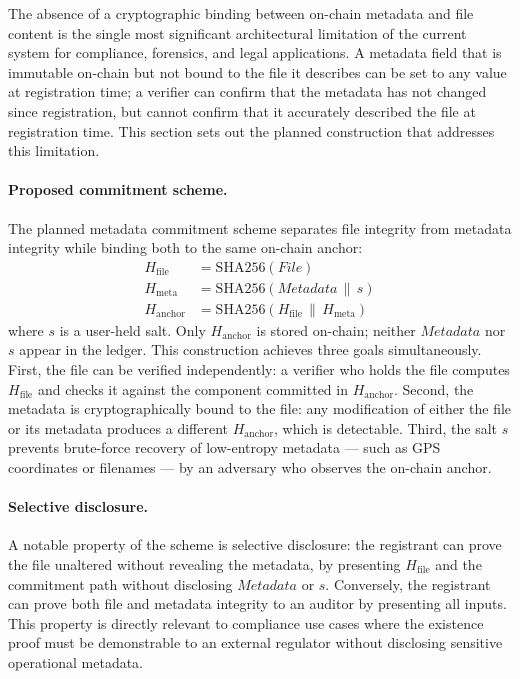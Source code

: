 \documentclass[11pt,a4paper]{article}
\begin{document}
The absence of a cryptographic binding between on-chain metadata and
file content is the single most significant architectural limitation
of the current system for compliance, forensics, and legal
applications. A metadata field that is immutable on-chain but not
bound to the file it describes can be set to any value at registration
time; a verifier can confirm that the metadata has not changed since
registration, but cannot confirm that it accurately described the file
at registration time. This section sets out the planned construction
that addresses this limitation.

\paragraph{Proposed commitment scheme.}
The planned metadata commitment scheme separates file integrity from
metadata integrity while binding both to the same on-chain anchor:
\begin{align*}
  H_{\mathrm{file}}   &= \mathrm{SHA256}(\mathit{File}) \\
  H_{\mathrm{meta}}   &= \mathrm{SHA256}(\mathit{Metadata} \,\|\, s) \\
  H_{\mathrm{anchor}} &= \mathrm{SHA256}(H_{\mathrm{file}} \,\|\, H_{\mathrm{meta}})
\end{align*}
where $s$ is a user-held salt. Only $H_{\mathrm{anchor}}$ is stored
on-chain; neither $\mathit{Metadata}$ nor $s$ appear in the ledger.
This construction achieves three goals simultaneously. First, the file
can be verified independently: a verifier who holds the file computes
$H_{\mathrm{file}}$ and checks it against the component committed in
$H_{\mathrm{anchor}}$. Second, the metadata is cryptographically bound
to the file: any modification of either the file or its metadata
produces a different $H_{\mathrm{anchor}}$, which is detectable.
Third, the salt $s$ prevents brute-force recovery of low-entropy
metadata --- such as GPS coordinates or filenames --- by an adversary
who observes the on-chain anchor.

\paragraph{Selective disclosure.}
A notable property of the scheme is selective disclosure: the
registrant can prove the file unaltered without revealing the
metadata, by presenting $H_{\mathrm{file}}$ and the commitment path
without disclosing $\mathit{Metadata}$ or $s$. Conversely, the
registrant can prove both file and metadata integrity to an auditor by
presenting all inputs. This property is directly relevant to
compliance use cases where the existence proof must be demonstrable to
an external regulator without disclosing sensitive operational
metadata.
\end{document}
